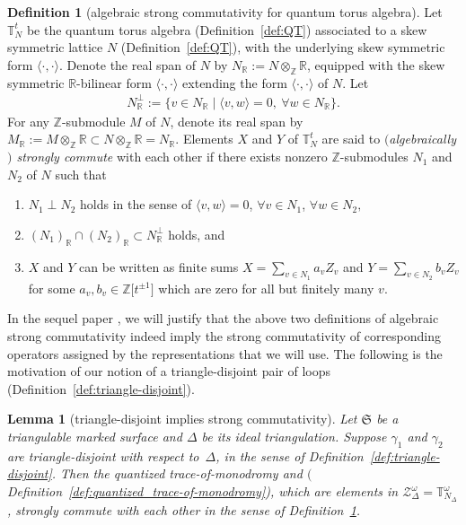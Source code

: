 \documentclass[10pt,a4paper]{amsart}
\numberwithin{equation}{section}
\newtheorem{Lemma}[Theorem]{Lemma}
\theoremstyle{definition}
\newtheorem{Definition}[Theorem]{Definition}
\begin{document}
\begin{Definition}[algebraic strong commutativity for quantum torus algebra]
\label{def:algebraic_SC2}
Let $\mathbb{T}^t_N$ be the quantum torus algebra (Definition~\ref{def:QT}) associated to a skew symmetric lattice $N$ (Definition~\ref{def:QT}), with the underlying skew symmetric form $\langle \cdot,\cdot \rangle$.
Denote the real span of $N$ by $N_\mathbb{R} := N \otimes_\mathbb{Z} \mathbb{R}$, equipped with the skew symmetric $\mathbb{R}$-bilinear form $\langle \cdot, \cdot\rangle$ extending the form $\langle \cdot,\cdot\rangle$ of $N$. Let
\begin{align}
\label{eq:N_R_perp}
N_\mathbb{R}^\perp := \{ v\in N_\mathbb{R} \mid \langle v,w\rangle=0, ~ \forall w\in N_\mathbb{R}\}.
\end{align}
For any $\mathbb{Z}$-submodule $M$ of $N$, denote its real span by $M_\mathbb{R} := M \otimes_\mathbb{Z} \mathbb{R} \subset N \otimes_\mathbb{Z} \mathbb{R} = N_\mathbb{R}$.
Elements $X$ and $Y$ of $\mathbb{T}^t_N$ are said to {\em $($algebraically$)$ strongly commute} with each other if there exists nonzero $\mathbb{Z}$-submodules $N_1$ and $N_2$ of $N$ such that
\begin{enumerate}[label={\rm (SC\arabic*)}]\itemsep=0pt\setlength{\leftskip}{0.22cm}
\item\label{SC1} $N_1 \perp N_2$ holds in the sense of
$\langle v,w\rangle=0$, $\forall v\in N_1$, $\forall w\in N_2,$
\item\label{SC2}
$(N_1)_\mathbb{R} \cap (N_2)_\mathbb{R} \subset N_\mathbb{R}^\perp$ holds, and
\item\label{SC3} $X$ and $Y$ can be written as finite sums $X = \sum_{v\in N_1} a_v Z_v$ and $Y = \sum_{v \in N_2} b_v Z_v$ for some $a_v,b_v \in \mathbb{Z}\bigl[t^{\pm 1}\bigr]$ which are zero for all but finitely many $v$.
\end{enumerate}
\end{Definition}
In the sequel paper \cite{sequel}, we will justify that the above two definitions of algebraic strong commutativity indeed imply the strong commutativity of corresponding operators assigned by the representations that we will use.
The following is the motivation of our notion of a triangle-disjoint pair of loops (Definition~\ref{def:triangle-disjoint}).
\begin{Lemma}[triangle-disjoint implies strong commutativity]
\label{lem:triangle-disjoint_implies_strong_commutativity}
Let $\mathfrak{S}$ be a triangulable marked surface and $\Delta$ be its ideal triangulation. Suppose $\gamma_1$ and $\gamma_2$ are triangle-disjoint with respect to~$\Delta$, in the sense of Definition~{\rm \ref{def:triangle-disjoint}}. Then the quantized trace-of-monodromy  and  $($Definition~{\rm \ref{def:quantized_trace-of-monodromy})}, which are elements in $\mathcal{Z}^\omega_\Delta = \mathbb{T}^\omega_{N_\Delta}$, strongly commute with each other in the sense of Definition~{\rm \ref{def:algebraic_SC2}}.
\end{Lemma}
\end{document}
